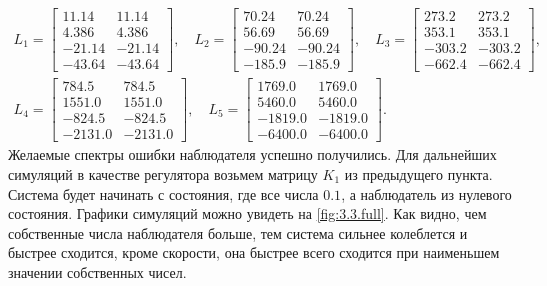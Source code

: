 \begin{gather*}
    L_1=\begin{bmatrix}
        11.14 & 11.14\\
        4.386 & 4.386\\
        -21.14 & -21.14\\
        -43.64 & -43.64
    \end{bmatrix},\quad
    L_2=\begin{bmatrix}
70.24 & 70.24\\
56.69 & 56.69\\
-90.24 & -90.24\\
-185.9 & -185.9
    \end{bmatrix},\quad
    L_3=\begin{bmatrix}
273.2 & 273.2\\
353.1 & 353.1\\
-303.2 & -303.2\\
-662.4 & -662.4
    \end{bmatrix},\\
    L_4=\begin{bmatrix}
784.5 & 784.5\\
1551.0 & 1551.0\\
-824.5 & -824.5\\
-2131.0 & -2131.0
    \end{bmatrix},\quad
    L_5=\begin{bmatrix}
1769.0 & 1769.0\\
5460.0 & 5460.0\\
-1819.0 & -1819.0\\
-6400.0 & -6400.0
    \end{bmatrix}.
\end{gather*}
Желаемые спектры ошибки наблюдателя успешно получились.
Для  дальнейших симуляций в качестве регулятора возьмем матрицу
$K_1$ из предыдущего пункта. 
Система будет начинать с состояния, где все числа $0.1$, а 
наблюдатель из нулевого состояния.
Графики симуляций можно увидеть на 
\autoref{fig:3.3.full}. Как видно, чем собственные числа наблюдателя больше,
тем система сильнее колеблется и быстрее сходится, кроме скорости,
она быстрее всего сходится при наименьшем значении собственных чисел.

